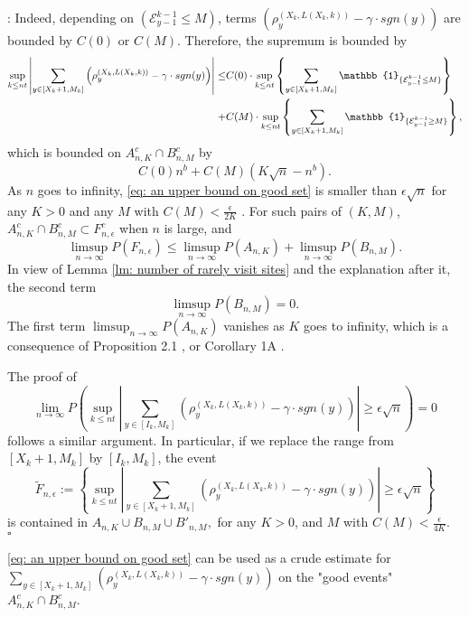 \documentclass[twoside,12pt,a4paper]{article}
\numberwithin{equation}{section}
\newenvironment{proof}{{\sc Proof}:}{~\hfill $\square$}
\newcommand{\abs}[1]{\left\vert #1 \right\vert}
\begin{document}
{\begin{proof}
	Indeed, depending on $(\mathcal{E}^{k-1}_{y-1} \leq M)$, terms  $\left( \rho^{(X_k,L(X_k,k))}_y -  \gamma \cdot sgn(y) \right)$ are bounded by $C(0)$ or $C(M)$. Therefore, the supremum is bounded by
	\begin{align*}
	 \sup_{k\leq n t}  \abs{  	\sum_{y\in [X_{k}+1 ,M_k]} \left( \rho^{(X_k,L(X_k,k))}_y -  \gamma \cdot sgn(y) \right) } \leq &  
	 C(0) \cdot \sup_{k\leq n t} \left\{   	\sum_{y\in [X_{k}+1 ,M_k]} \mathbb{1}_{ \{ \mathcal{E}^{k-1}_{y-1} \leq M \} } \right\}
	 \notag
	 \\
	 +& C(M) \cdot \sup_{k\leq n t} \left\{   	\sum_{y\in [X_{k}+1 ,M_k]} \mathbb{1}_{ \{ \mathcal{E}^{k-1}_{y-1} \geq M \} } \right\},
\end{align*} which is bounded on $A^c_{n,K} \cap B^c_{n,M}$ by
\begin{equation}\label{eq: an upper bound on good set}
	C(0)n^b  + C(M) \left(K \sqrt{n} -n^b\right).
\end{equation} As $n$ goes to infinity, \eqref{eq: an upper bound on good set} is smaller than $\epsilon \sqrt{n}$ for any $K>0$ and any $M$ with $C(M) < \frac{\epsilon}{2K}$ . 
For such pairs of $(K,M)$, $A^c_{n,K} \cap B^c_{n,M} \subset F^c_{n,\epsilon}$ when $n$ is large,  and 
$$
\limsup_{n\to \infty} P(F_{n,\epsilon}) \leq \limsup_{n\to \infty}  P(A_{n,K}) +  \limsup_{n\to \infty}  P(B_{n,M}).
$$ In view of Lemma \ref{lm: number of rarely visit sites} and the explanation after it, the second term $$\limsup_{n\to \infty}  P(B_{n,M})=0.$$  The first term $\limsup_{n\to \infty}  P(A_{n,K}) $ vanishes as $K$ goes to infinity, which is a consequence of Proposition 2.1 \cite{KMP22}, or Corollary 1A \cite{T96}.
 
The proof of 
$$  
\lim_{n\to\infty} P\left( \sup_{k\leq n t}  \abs{  	\sum_{y\in [I_k ,M_k]} \left( \rho^{(X_k,L(X_k,k))}_y -  \gamma \cdot sgn(y) \right) } \geq  \epsilon \sqrt{n}     \right) =0
$$ 
follows a similar argument. In particular, if we replace the range from $[X_k+1, M_k]$ by $[I_k,M_k]$, the event 
$$
\tilde{F}_{n,\epsilon}:= \left\{ \sup_{k\leq n t}  \abs{  	\sum_{y\in [X_{k}+1 ,M_{k}]} \left( \rho^{(X_k,L(X_k,k))}_y -  \gamma \cdot sgn(y) \right) } \geq  \epsilon \sqrt{n}    \right \}
$$ 
is contained in $A_{n,K} \cup B_{n,M} \cup  B'_{n,M},$ for any $K>0$, and $M$ with $C(M) < \frac{\epsilon}{4K}$.
\end{proof}

\eqref{eq: an upper bound on good set} can be used as a crude estimate for 	$\sum_{y\in [X_{k}+1 ,M_{k}]} \left( \rho^{(X_k,L(X_k,k))}_y -  \gamma \cdot sgn(y) \right)$   on the "good events" $A^c_{n,K}\cap B^c_{n,M}$.

}
\end{document}
